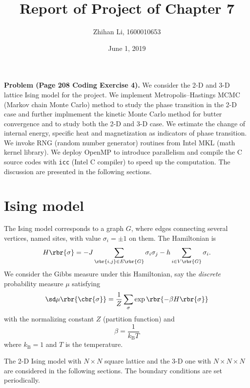 \documentclass[english, nochinese]{pnote}
\title{Report of Project of Chapter 7}
\author{Zhihan Li, 1600010653}
\date{June 1, 2019}
\begin{document}
\maketitle

\textbf{Problem (Page 208 Coding Exercise 4).} We consider the 2-D and 3-D lattice Ising model for the project. We implement Metropolis--Hastings MCMC (Markov chain Monte Carlo) method to study the phase transition in the 2-D case and further implmement the kinetic Monte Carlo method for butter convergence and to study both the 2-D and 3-D case. We estimate the change of internal energy, specific heat and magnetization as indicators of phase transition. We invoke RNG (random number generator) routines from Intel MKL (math kernel library). We deploy OpenMP to introduce parallelism and compile the C source codes with \verb"icc" (Intel C compiler) to speed up the computation. The discussion are presented in the following sections.

\section{Ising model}

The Ising model corresponds to a graph $G$, where edges connecting several vertices, named sites, with value $ \sigma_i = \pm 1 $ on them. The Hamiltonian is
\begin{equation}
H \rbr{\sigma} = - J \sum_{ \rbr{ i, j } \in E \rbr{G} } \sigma_i \sigma_j - h \sum_{ i \in V \rbr{G} } \sigma_i.
\end{equation}
We consider the Gibbs measure under this Hamiltonian, say the \emph{discrete} probability measure $\mu$ satisfying
\begin{equation}
\sd \mu \rbr{\cbr{\sigma}} = \frac{1}{Z} \sum_{\sigma} \exp \rbr{ -\beta H \rbr{\sigma} }
\end{equation}
with the normalizing constant $Z$ (partition function) and
\begin{equation}
\beta = \frac{1}{ k_{\text{B}} T }
\end{equation}
where $ k_{\text{B}} = 1 $ and $T$ is the temperature.

The 2-D Ising model with $ N \times N $ square lattice and the 3-D one with $ N \times N \times N $ are considered in the following sections. The boundary conditions are set periodically.
\end{document}
